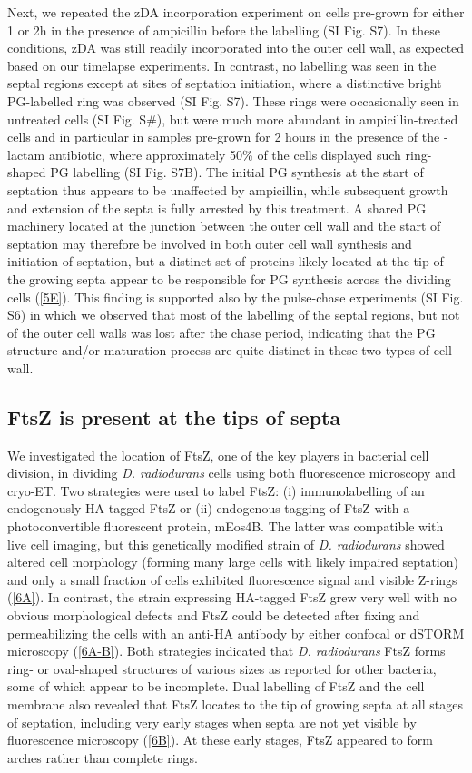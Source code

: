 Next, we repeated the zDA incorporation experiment on cells pre-grown for either 1 or 2h in the presence of ampicillin before the labelling (SI Fig. S7).
In these conditions, zDA was still readily incorporated into the outer cell wall, as expected based on our timelapse experiments.
In contrast, no labelling was seen in the septal regions except at sites of septation initiation, where a distinctive bright PG-labelled ring was observed (SI Fig. S7).
These rings were occasionally seen in untreated cells (SI Fig. S\#), but were much more abundant in ampicillin-treated cells and in particular in samples pre-grown for 2 hours in the presence of the \beta-lactam antibiotic, where approximately 50\% of the cells displayed such ring-shaped PG labelling (SI Fig. S7B).
The initial PG synthesis at the start of septation thus appears to be unaffected by ampicillin, while subsequent growth and extension of the septa is fully arrested by this treatment.
A shared PG machinery located at the junction between the outer cell wall and the start of septation may therefore be involved in both outer cell wall synthesis and initiation of septation, but a distinct set of proteins likely located at the tip of the growing septa appear to be responsible for PG synthesis across the dividing cells (\autoref{5E}).
This finding is supported also by the pulse-chase experiments (SI Fig. S6) in which we observed that most of the labelling of the septal regions, but not of the outer cell walls was lost after the chase period, indicating that the PG structure and/or maturation process are quite distinct in these two types of cell wall.

\subsection{FtsZ is present at the tips of septa}\label{drad_ftsz}

We investigated the location of FtsZ, one of the key players in bacterial cell division, in dividing \textit{D. radiodurans} cells using both fluorescence microscopy and cryo-ET.
Two strategies were used to label FtsZ: (i) immunolabelling of an endogenously HA-tagged FtsZ or (ii) endogenous tagging of FtsZ with a photoconvertible fluorescent protein, mEos4B.
The latter was compatible with live cell imaging, but this genetically modified strain of \textit{D. radiodurans} showed altered cell morphology (forming many large cells with likely impaired septation) and only a small fraction of cells exhibited fluorescence signal and visible Z-rings (\autoref{6A}).
In contrast, the strain expressing HA-tagged FtsZ grew very well with no obvious morphological defects and FtsZ could be detected after fixing and permeabilizing the cells with an anti-HA antibody by either confocal or dSTORM microscopy (\autoref{6A-B}).
Both strategies indicated that \textit{D. radiodurans} FtsZ forms ring- or oval-shaped structures of various sizes as reported for other bacteria, some of which appear to be incomplete.
Dual labelling of FtsZ and the cell membrane also revealed that FtsZ locates to the tip of growing septa at all stages of septation, including very early stages when septa are not yet visible by fluorescence microscopy (\autoref{6B}).
At these early stages, FtsZ appeared to form arches rather than complete rings.

